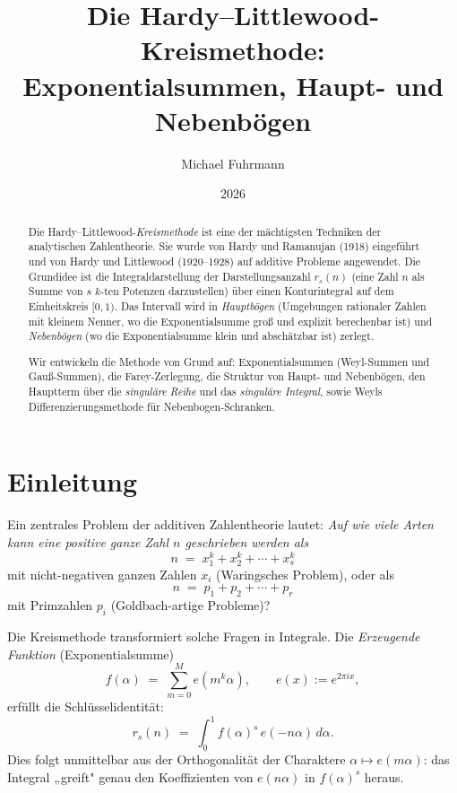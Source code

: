 \documentclass[12pt,a4paper]{amsart}
\theoremstyle{definition}
\newcommand{\eq}[1]{e\!\left(#1\right)}
\begin{document}
\title{Die Hardy--Littlewood-Kreismethode:\\
       Exponentialsummen, Haupt- und Nebenbögen}

\author{Michael Fuhrmann}
\address{Specialist Mathematics Project, Build 80}
\date{2026}

\begin{abstract}
Die Hardy--Littlewood-\emph{Kreismethode} ist eine der mächtigsten
Techniken der analytischen Zahlentheorie.  Sie wurde von Hardy und
Ramanujan (1918) eingeführt und von Hardy und Littlewood (1920--1928) auf
additive Probleme angewendet.  Die Grundidee ist die Integraldarstellung
der Darstellungsanzahl $r_s(n)$ (eine Zahl $n$ als Summe von $s$
$k$-ten Potenzen darzustellen) über einen Konturintegral auf dem
Einheitskreis $[0,1)$.  Das Intervall wird in \emph{Hauptbögen}
(Umgebungen rationaler Zahlen mit kleinem Nenner, wo die Exponentialsumme
groß und explizit berechenbar ist) und \emph{Nebenbögen} (wo die
Exponentialsumme klein und abschätzbar ist) zerlegt.

Wir entwickeln die Methode von Grund auf: Exponentialsummen (Weyl-Summen
und Gauß-Summen), die Farey-Zerlegung, die Struktur von Haupt- und
Nebenbögen, den Hauptterm über die \emph{singuläre Reihe} und das
\emph{singuläre Integral}, sowie Weyls Differenzierungsmethode für
Nebenbogen-Schranken.
\end{abstract}

\maketitle
\tableofcontents

\section{Einleitung}

Ein zentrales Problem der additiven Zahlentheorie lautet: \emph{Auf wie
viele Arten kann eine positive ganze Zahl $n$ geschrieben werden als}
\[
  n \;=\; x_1^k + x_2^k + \cdots + x_s^k
\]
mit nicht-negativen ganzen Zahlen $x_i$ (Waringsches Problem), oder als
\[
  n \;=\; p_1 + p_2 + \cdots + p_r
\]
mit Primzahlen $p_i$ (Goldbach-artige Probleme)?

Die Kreismethode transformiert solche Fragen in Integrale.  Die
\emph{Erzeugende Funktion} (Exponentialsumme)
\[
  f(\alpha) \;=\; \sum_{m=0}^{M} \eq{m^k \alpha},
  \qquad \eq{x} := e^{2\pi i x},
\]
erfüllt die Schlüsselidentität:
\begin{equation}\label{eq:key}
  r_s(n) \;=\; \int_0^1 f(\alpha)^s\, \eq{-n\alpha}\, d\alpha.
\end{equation}
Dies folgt unmittelbar aus der Orthogonalität der Charaktere
$\alpha \mapsto \eq{m\alpha}$: das Integral „greift" genau den
Koeffizienten von $\eq{n\alpha}$ in $f(\alpha)^s$ heraus.
\end{document}
